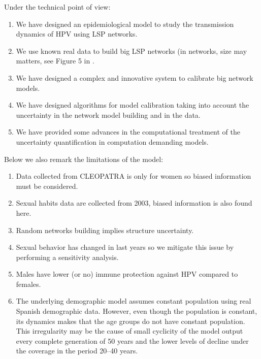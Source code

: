 Under the technical point of view:
\begin{enumerate}
	\item We have designed an epidemiological model to study the transmission dynamics of HPV using LSP networks.
	\item We use known real data to build big LSP networks (in networks, size may matters, see Figure 5 in \cite{villanueva2013epidemic}.
	\item We have designed a complex and innovative system to calibrate big network models.
	\item We have designed algorithms for model calibration taking into account the uncertainty in the network model building and in the data. 
	\item We have provided some advances in the computational treatment of the uncertainty quantification in computation demanding models.
\end{enumerate}

Below we also remark the limitations of the model:
\begin{enumerate}
	\item Data collected from CLEOPATRA is only for women so biased information must be considered.
	\item Sexual habits data are collected from 2003, biased information is also found here.
	\item Random networks building implies structure uncertainty.
	\item Sexual behavior has changed in last years so we mitigate this issue by performing a sensitivity analysis.
	\item Males have lower (or no) immune protection against HPV compared to females.
	\item The underlying demographic model assumes constant population using real Spanish demographic data. However, even though the population is constant, its dynamics makes that the age groups do not have constant population. This irregularity may be the cause of small cyclicity of the model output every complete generation of 50 years and the lower levels of decline under the coverage in the period 20–40 years.
\end{enumerate}

